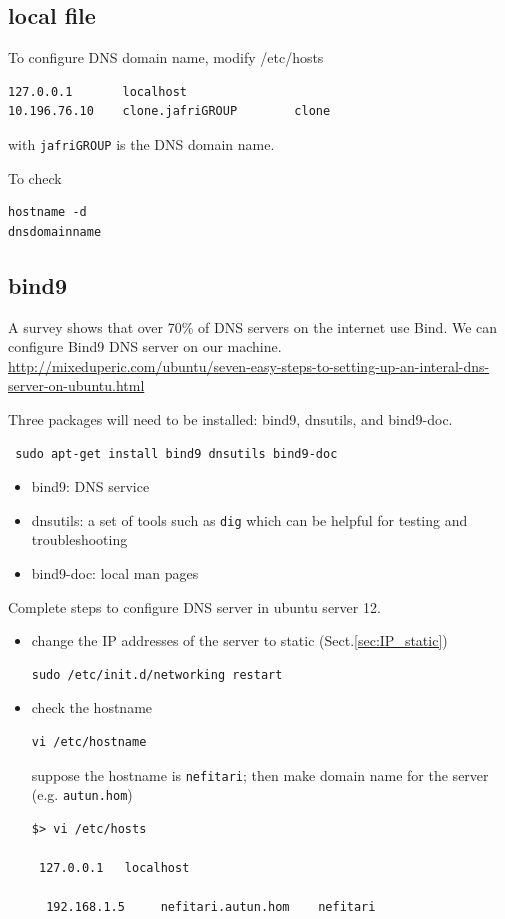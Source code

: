 \subsection{local file}

To configure DNS domain name, modify /etc/hosts
\begin{verbatim}
127.0.0.1       localhost
10.196.76.10    clone.jafriGROUP        clone
\end{verbatim}
with \verb!jafriGROUP! is the DNS domain name.

To check
\begin{verbatim}
hostname -d
dnsdomainname
\end{verbatim}

\subsection{bind9}
\label{sec:bind9}

 A survey shows that over 70\% of DNS servers on the internet use Bind. We can
 configure Bind9 DNS server on our machine.
 \url{http://mixeduperic.com/ubuntu/seven-easy-steps-to-setting-up-an-interal-dns-server-on-ubuntu.html}
 
 Three packages will need to be installed: bind9, dnsutils, and bind9-doc.
 \begin{verbatim}
 sudo apt-get install bind9 dnsutils bind9-doc
 \end{verbatim}
 
 \begin{itemize}
   \item bind9: DNS service
   \item dnsutils: a set of tools such as \verb!dig! which can be helpful for
   testing and troubleshooting
   
   \item bind9-doc: local man pages
 \end{itemize}
 
 Complete steps to configure DNS server in ubuntu server 12.
 \begin{itemize}
   \item change the IP addresses of the server to static (Sect.\ref{sec:IP_static})
\begin{verbatim}
sudo /etc/init.d/networking restart
\end{verbatim}   

   \item check the hostname
\begin{verbatim}
vi /etc/hostname
\end{verbatim} 
suppose the hostname is \verb!nefitari!; then
make domain name for the server (e.g. \verb!autun.hom!)
\begin{verbatim}
$> vi /etc/hosts

 127.0.0.1   localhost

  192.168.1.5     nefitari.autun.hom    nefitari
\end{verbatim}


 \end{itemize}
 
